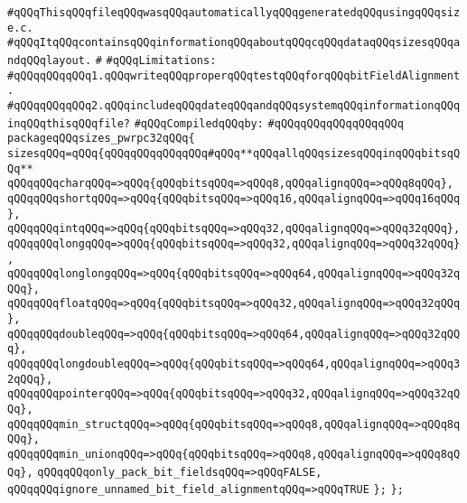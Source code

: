 \label{src/app/c-glue-maker/sizes-pwrpc32.pkg}
\verb|#qQQqThisqQQqfileqQQqwasqQQqautomaticallyqQQqgeneratedqQQqusingqQQqsize.c.|\newline
\verb|#qQQqItqQQqcontainsqQQqinformationqQQqaboutqQQqcqQQqdataqQQqsizesqQQqandqQQqlayout.|\newline
\verb|#|\newline
\verb|#qQQqLimitations:|\newline
\verb|#qQQqqQQqqQQq1.qQQqwriteqQQqproperqQQqtestqQQqforqQQqbitFieldAlignment.|\newline
\verb|#qQQqqQQqqQQq2.qQQqincludeqQQqdateqQQqandqQQqsystemqQQqinformationqQQqinqQQqthisqQQqfile?|\newline
\newline
\verb|#qQQqCompiledqQQqby:|\newline
\verb|#qQQqqQQqqQQqqQQqqQQq|\newline
\newline
\verb|packageqQQqsizes_pwrpc32qQQq{|\newline
\verb|sizesqQQq=qQQq{qQQqqQQqqQQqqQQq#qQQq**qQQqallqQQqsizesqQQqinqQQqbitsqQQq**|\newline
\verb|qQQqqQQqcharqQQq=>qQQq{qQQqbitsqQQq=>qQQq8,qQQqalignqQQq=>qQQq8qQQq},|\newline
\verb|qQQqqQQqshortqQQq=>qQQq{qQQqbitsqQQq=>qQQq16,qQQqalignqQQq=>qQQq16qQQq},|\newline
\verb|qQQqqQQqintqQQq=>qQQq{qQQqbitsqQQq=>qQQq32,qQQqalignqQQq=>qQQq32qQQq},|\newline
\verb|qQQqqQQqlongqQQq=>qQQq{qQQqbitsqQQq=>qQQq32,qQQqalignqQQq=>qQQq32qQQq},|\newline
\verb|qQQqqQQqlonglongqQQq=>qQQq{qQQqbitsqQQq=>qQQq64,qQQqalignqQQq=>qQQq32qQQq},|\newline
\verb|qQQqqQQqfloatqQQq=>qQQq{qQQqbitsqQQq=>qQQq32,qQQqalignqQQq=>qQQq32qQQq},|\newline
\verb|qQQqqQQqdoubleqQQq=>qQQq{qQQqbitsqQQq=>qQQq64,qQQqalignqQQq=>qQQq32qQQq},|\newline
\verb|qQQqqQQqlongdoubleqQQq=>qQQq{qQQqbitsqQQq=>qQQq64,qQQqalignqQQq=>qQQq32qQQq},|\newline
\verb|qQQqqQQqpointerqQQq=>qQQq{qQQqbitsqQQq=>qQQq32,qQQqalignqQQq=>qQQq32qQQq},|\newline
\verb|qQQqqQQqmin_structqQQq=>qQQq{qQQqbitsqQQq=>qQQq8,qQQqalignqQQq=>qQQq8qQQq},|\newline
\verb|qQQqqQQqmin_unionqQQq=>qQQq{qQQqbitsqQQq=>qQQq8,qQQqalignqQQq=>qQQq8qQQq},|\newline
\verb|qQQqqQQqonly_pack_bit_fieldsqQQq=>qQQqFALSE,|\newline
\verb|qQQqqQQqignore_unnamed_bit_field_alignmentqQQq=>qQQqTRUE|\newline
\verb|};|\newline
\verb|};|\newline


